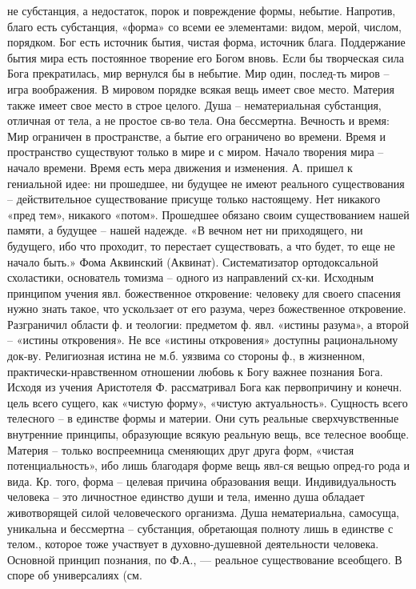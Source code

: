 \documentclass[12pt]{article}
\begin{document}
не субстанция, а недостаток, порок и повреждение формы, небытие. Напротив, благо есть субстанция, «форма»
со всеми ее элементами: видом, мерой, числом, порядком. Бог есть источник бытия, чистая форма, источник
блага. Поддержание бытия мира есть постоянное творение его Богом вновь. Если бы творческая сила Бога
прекратилась, мир вернулся бы в небытие. Мир один, послед-ть миров – игра воображения. В мировом порядке
всякая вещь имеет свое место. Материя также имеет свое место в строе целого.
Душа – нематериальная субстанция, отличная от тела, а не простое св-во тела. Она бессмертна.
Вечность и время: Мир ограничен в пространстве, а бытие его ограничено во времени. Время и пространство
существуют только в мире и с миром. Начало творения мира – начало времени. Время есть мера движения и
изменения. А. пришел к гениальной идее: ни прошедшее, ни будущее не имеют реального существования –
действительное существование присуще только настоящему. Нет никакого «пред тем», никакого «потом».
Прошедшее обязано своим существованием нашей памяти, а будущее – нашей надежде. «В вечном нет ни
приходящего, ни будущего, ибо что проходит, то перестает существовать, а что будет, то еще не начало быть.»
Фома Аквинский (Аквинат). Систематизатор ортодоксальной схоластики, основатель томизма – одного из
направлений сх-ки. Исходным принципом учения явл. божественное откровение: человеку для своего спасения
нужно знать такое, что ускользает от его разума, через божественное откровение.
Разграничил области ф. и теологии: предметом ф. явл. «истины разума», а второй – «истины откровения». Не
все «истины откровения» доступны рациональному док-ву. Религиозная истина не м.б. уязвима со стороны ф., в
жизненном, практически-нравственном отношении любовь к Богу важнее познания Бога.
Исходя из учения Аристотеля Ф. рассматривал Бога как первопричину и конечн. цель всего сущего, как «чистую
форму», «чистую актуальность». Сущность всего телесного – в единстве формы и материи. Они суть реальные
сверхчувственные внутренние принципы, образующие всякую реальную вещь, все телесное вообще. Материя –
только воспреемница сменяющих друг друга форм, «чистая потенциальность», ибо лишь благодаря форме вещь
явл-ся вещью опред-го рода и вида. Кр. того, форма – целевая причина образования вещи.
Индивидуальность человека – это личностное единство души и тела, именно душа обладает животворящей
силой человеческого организма. Душа нематериальна, самосуща, уникальна и бессмертна – субстанция,
обретающая полноту лишь в единстве с телом., которое тоже участвует в духовно-душевной деятельности
человека.
Основной принцип познания, по Ф.А., — реальное существование всеобщего. В споре об универсалиях (см.
\end{document}
